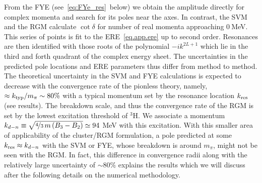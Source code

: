 \documentclass[5p,times]{elsarticle}
\newcommand{\eftnopi}{\mbox{EFT($\slashed{\pi}$) }}
\begin{document}
From the FYE (see~\eqref{eq:FYe_res}~below) we obtain the amplitude directly for complex momenta and
search for its poles near the axes. In contrast, the SVM and the RGM calculate $\cot\delta$ for number of real
momenta approaching $0~$MeV. This series of points is fit to the ERE~\eqref{eq.app.ere} up to second order.
Resonances are then identified with those roots of the polynomial $-ik^{2L+1}$ which lie in the third and forth quadrant
of the complex energy sheet.
%
The uncertainties in the predicted pole locations and ERE parameters thus differ from method to method. 
The theoretical uncertainty in the SVM and FYE calculations is expected to decrease with the convergence rate
of the pionless theory, namely, $\approx k_{\rm typ}/m_\pi\sim80\%$ with a typical momentum set by the
resonance location $k_{\rm res}$ (see results).
The breakdown scale, and thus the convergence rate of the RGM is set by the lowest excitation threshold of $^3$H.
We associate a momentum $k_{d-n}\equiv\sqrt{\nicefrac{4}{3}\, m\,(B_3-B_2)}\simeq94$ MeV with this excitation.
With this smaller area of applicability of the cluster/RGM formulation, a pole predicted at some $k_{\rm res}\approx k_{d-n}$
with the SVM or FYE, whose breakdown is around $m_\pi$, might not be seen with the RGM. In fact, this difference in convergence radii
along with the relatively large uncertainty of $\sim80\%$ explains the results which we will discuss
after the following details on the numerical methodology.

\end{document}
